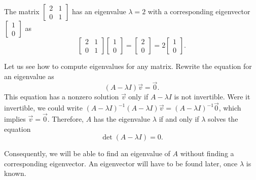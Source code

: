 \documentclass[12pt]{book}
\begin{document}
\begin{example}
The matrix $\left[ \begin{smallmatrix}
2 & 1 \\
0 & 1
\end{smallmatrix} \right]$ has an eigenvalue $\lambda = 2$ with a
corresponding
eigenvector $\left[ \begin{smallmatrix}
1 \\ 0
\end{smallmatrix} \right]$ as
\begin{equation*}
\begin{bmatrix}
2 & 1 \\
0 & 1
\end{bmatrix}
\begin{bmatrix}
1 \\ 0
\end{bmatrix}
=
\begin{bmatrix}
2 \\
0 
\end{bmatrix}
=
2
\begin{bmatrix}
1 \\ 0
\end{bmatrix} .
\end{equation*}
\end{example}

Let us see how to compute eigenvalues for any matrix.
Rewrite the equation for an eigenvalue as
\begin{equation*}
(A - \lambda I)\vec{v} = \vec{0} .
\end{equation*}
This equation has a nonzero solution $\vec{v}$ only if 
$A - \lambda I$ is not invertible.  Were it invertible,
we could write
${(A - \lambda I)}^{-1}(A - \lambda I)\vec{v} = {(A-\lambda I)}^{-1}\vec{0}$,
which implies $\vec{v} = \vec{0}$.  Therefore,
$A$ has the
eigenvalue $\lambda$ if and only if $\lambda$ solves the equation
\begin{equation*}
\det (A-\lambda I) = 0 .
\end{equation*}

Consequently, we will be able to find an eigenvalue of $A$ without
finding a corresponding eigenvector.  An eigenvector will have to be
found later, once $\lambda$ is known.
\end{document}
